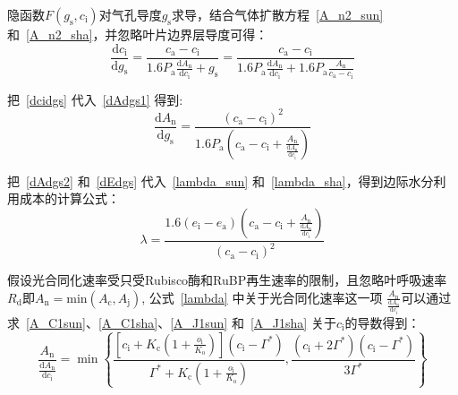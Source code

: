 隐函数$F\left(g_{\mathrm{s}},c_{\mathrm{i}}\right)$对气孔导度$g_{\mathrm{s}}$求导，结合气体扩散方程~\eqref{A_n2_sun}和~\eqref{A_n2_sha}，并忽略叶片边界层导度可得：
\begin{equation}\label{dcidgs}
    \frac{\mathrm{d}c_{\mathrm{i}}}{\mathrm{d}g_{\mathrm{s}}}=\frac{c_{\mathrm{a}}-c_{\mathrm{i}}}{1.6P_{\mathrm {a}}\frac{\mathrm{d}A_{\mathrm{n}}}{\mathrm{d}c_{\mathrm{i}}}+g_{\mathrm{s}}}=\frac{c_{\mathrm{a}}-c_{\mathrm{i}}}{1.6P_{\mathrm {a}}\frac{\mathrm{d}A_{\mathrm{n}}}{\mathrm{d}c_{\mathrm{i}}}+1.6P_{\mathrm {a}}\frac{A_{\mathrm{n}}}{c_{\mathrm{a}}-c_{\mathrm{i}}}}
\end{equation}

把~\eqref{dcidgs} 代入~\eqref{dAdgs1} 得到:
\begin{equation}\label{dAdgs2}
    \frac{\mathrm{d}A_{\mathrm{n}}}{\mathrm{d}g_{\mathrm{s}}}=\frac{\left(c_{\mathrm{a}}-c_{\mathrm{i}}\right)^2}{1.6P_{\mathrm {a}}\left(c_{\mathrm{a}}-c_{\mathrm{i}}+\frac{A_{\mathrm{n}}}{\frac{\mathrm{d}A_{\mathrm{n}}}{\mathrm{d}c_{\mathrm{i}}}}\right)}
\end{equation}

把~\eqref{dAdgs2} 和~\eqref{dEdgs} 代入~\eqref{lambda_sun} 和~\eqref{lambda_sha}，得到边际水分利用成本的计算公式：
\begin{equation}\label{lambda}
\lambda=\frac{1.6\left(e_{\mathrm{i}}-e_{\mathrm{a}}\right)\left(c_{\mathrm{a}}-c_{\mathrm{i}}+\frac{A_{\mathrm{n}}}{\frac{\mathrm{d}A_{\mathrm{n}}}{\mathrm{d}c_{\mathrm{i}}}}\right)}{\left(c_{\mathrm{a}}-c_{\mathrm{i}}\right)^2}
\end{equation}

假设光合同化速率受只受Rubisco酶和RuBP再生速率的限制，且忽略叶呼吸速率$R_{\mathrm{d}}$即$A_{\mathrm{n}}=\mathrm{min}\left(A_{\mathrm{c}},A_{\mathrm{j}}\right)$, 公式~\eqref{lambda} 中关于光合同化速率这一项 $\frac{A_{\mathrm{n}}}{\frac{\mathrm{d}A_{\mathrm{n}}}{\mathrm{d}c_{\mathrm{i}}}}$可以通过求~\eqref{A_C1sun}、\eqref{A_C1sha}、\eqref{A_J1sun} 和~\eqref{A_J1sha} 关于$c_{\mathrm{i}}$的导数得到：
%
\begin{equation}\label{AdAdci}
    \frac{A_{\mathrm{n}}}{\frac{\mathrm{d}A_{\mathrm{n}}}{\mathrm{d}c_{\mathrm{i}}}}=\min\left\{\frac{\left[c_{\mathrm{i}}+K_{\mathrm{c}}\left(1+\frac{o_{\mathrm{i}}}{K_{\mathrm{o}}}\right)\right]\left(c_{\mathrm{i}}-\Gamma^*\right)}{\Gamma^*+K_{\mathrm{c}}\left(1+\frac{o_{\mathrm{i}}}{K_{\mathrm{o}}}\right)},\frac{\left(c_{\mathrm{i}}+2\Gamma^*\right)\left(c_{\mathrm{i}}-\Gamma^*\right)}{3\Gamma^*}\right\}
\end{equation}

